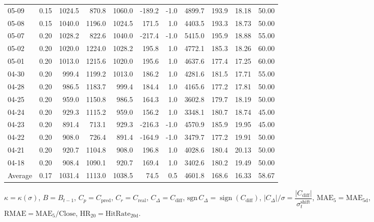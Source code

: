 \begin{threeparttable}
{\begin{tabular}{lrrrrrrrrrr}
05-09 & 0.15 & 1024.5 & 870.8 & 1060.0 & -189.2 & -1.0 & 4899.7 & 193.9 & 18.18 & 50.00 \\
05-08 & 0.15 & 1040.0 & 1196.0 & 1024.5 & 171.5 & 1.0 & 4403.5 & 193.3 & 18.73 & 50.00 \\
05-07 & 0.20 & 1028.2 & 822.6 & 1040.0 & -217.4 & -1.0 & 5415.0 & 195.9 & 18.88 & 55.00 \\
05-02 & 0.20 & 1020.0 & 1224.0 & 1028.2 & 195.8 & 1.0 & 4772.1 & 185.3 & 18.26 & 60.00 \\
05-01 & 0.20 & 1013.0 & 1215.6 & 1020.0 & 195.6 & 1.0 & 4637.6 & 177.4 & 17.25 & 60.00 \\
04-30 & 0.20 & 999.4 & 1199.2 & 1013.0 & 186.2 & 1.0 & 4281.6 & 181.5 & 17.71 & 55.00 \\
04-28 & 0.20 & 986.5 & 1183.7 & 999.4 & 184.4 & 1.0 & 4165.6 & 177.2 & 17.81 & 50.00 \\
04-25 & 0.20 & 959.0 & 1150.8 & 986.5 & 164.3 & 1.0 & 3602.8 & 179.7 & 18.19 & 50.00 \\
04-24 & 0.20 & 929.3 & 1115.2 & 959.0 & 156.2 & 1.0 & 3348.1 & 180.7 & 18.74 & 45.00 \\
04-23 & 0.20 & 891.4 & 713.1 & 929.3 & -216.3 & -1.0 & 4570.9 & 185.9 & 19.95 & 45.00 \\
04-22 & 0.20 & 908.0 & 726.4 & 891.4 & -164.9 & -1.0 & 3479.7 & 177.2 & 19.91 & 50.00 \\
04-21 & 0.20 & 920.7 & 1104.8 & 908.0 & 196.8 & 1.0 & 4028.6 & 180.4 & 20.13 & 50.00 \\
04-18 & 0.20 & 908.4 & 1090.1 & 920.7 & 169.4 & 1.0 & 3402.6 & 180.2 & 19.49 & 50.00 \\
Average & 0.17 & 1031.4 & 1113.0 & 1038.5 & 74.5 & 0.5 & 4601.8 & 168.6 & 16.33 & 58.67 \\
\bottomrule
\end{tabular}
}%
\begin{tablenotes}\footnotesize
\item $\kappa=\kappa(\sigma)$, $B=B_{t-1}$, $C_p=C_{\text{pred}}$, $C_r=C_{\text{real}}$, $C_\Delta=C_{\text{diff}}$, $\mathrm{sgn}\,C_\Delta=\operatorname{sign}(C_{\text{diff}})$, $|C_\Delta|/\sigma=\dfrac{|C_{\text{diff}}|}{\sigma_t^{\text{shift}}}$, $\mathrm{MAE}_5=\mathrm{MAE}_{5\text{d}}$, $\mathrm{RMAE}= \mathrm{MAE}_5 / \text{Close}$, $\mathrm{HR}_{20}=\mathrm{HitRate}_{20\text{d}}$.
\end{tablenotes}
\end{threeparttable}
\endgroup